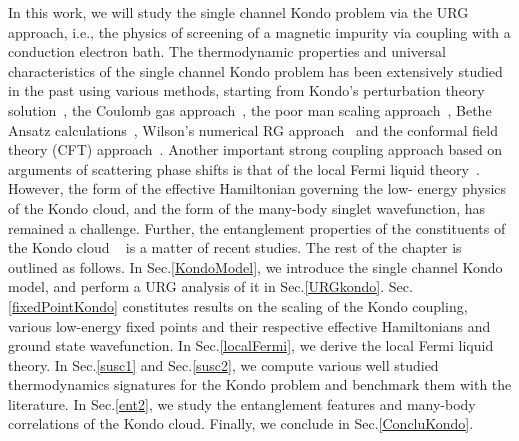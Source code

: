 \documentclass[aps,prb,preprint,groupedaddress]{revtex4-2}
\begin{document}
\maketitle
In this work, we will study the single channel Kondo problem via the URG approach, i.e., the physics of screening of a magnetic impurity via coupling with a conduction electron bath. The thermodynamic properties and universal characteristics of the single channel Kondo problem has been extensively studied in the past using various methods, starting from Kondo's perturbation theory solution~\cite{kondo1964resistance}, the Coulomb gas approach~\cite{anderson1969exact,anderson1970exact}, the poor man scaling approach~\cite{anderson1970poor}, Bethe Ansatz calculations~\cite{andreiKondoreview,tsvelickKondoreview}, Wilson's numerical RG approach~\cite{wilson1975,bullaNRGreview} and the conformal field theory (CFT) approach~\cite{affleck1995conformal,affleck1993exact}.
Another important strong coupling approach based on arguments of scattering phase shifts is that of the local Fermi liquid theory~\cite{nozieres1974fermi,nozaki2012}. 
\pin
However, the form of the effective Hamiltonian governing the low- energy physics of the Kondo cloud, and the form of the many-body singlet wavefunction, has remained a challenge. Further, the entanglement properties of the constituents of the Kondo cloud ~\cite{yoo2018detecting} is a matter of recent studies.  
The rest of the chapter is outlined as follows. In Sec.\ref{KondoModel}, we introduce the single channel Kondo model, and perform a URG analysis of it in Sec.\ref{URGkondo}. Sec.\ref{fixedPointKondo} constitutes results on the scaling of the Kondo coupling, various low-energy fixed points and their respective effective Hamiltonians and ground state wavefunction.  In Sec.\ref{localFermi}, we derive the local Fermi liquid theory. In Sec.\ref{susc1} and Sec.\ref{susc2}, we compute various well studied thermodynamics signatures for the Kondo problem and benchmark them with the literature. In Sec.\ref{ent2}, we study the entanglement features and many-body correlations of the Kondo cloud. Finally, we conclude in Sec.\ref{ConcluKondo}.
\end{document}
